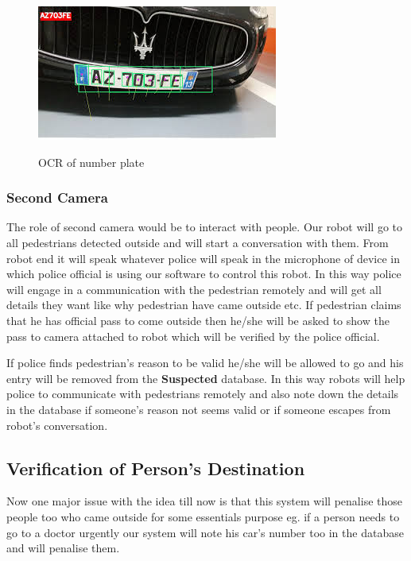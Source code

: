 \documentclass[10pt,twocolumn,letterpaper]{article}
\begin{document}
\begin{figure}[!htb]
	\centering\includegraphics[width=\columnwidth]{ocr}\\
	\caption{OCR of number plate}\label{ocr}
\end{figure}

\subsubsection{Second Camera}
The role of second camera would be to interact with people. Our robot will go to all pedestrians detected outside and will start a conversation with them. From robot end it will speak whatever police will speak in the microphone of device in which police official is using our software to control this robot. In this way police will engage in a communication with the pedestrian remotely and will get all details they want like why pedestrian have came outside etc. If pedestrian claims that he has official pass to come outside then he/she will be asked to show the pass to camera attached to robot which will be verified by the police official. 

If police finds pedestrian's reason to be valid he/she will be allowed to go and his entry will be removed from the \textbf{Suspected} database. In this way robots will help police to communicate with pedestrians remotely and also note down the details in the database if someone's reason not seems valid or if someone escapes from robot's conversation.

\subsection{Verification of Person's Destination}
\label{sec:ver}
Now one major issue with the idea till now is that this system will penalise those people too who came outside for some essentials purpose eg. if a person needs to go to a doctor urgently our system will note his car's number too in the database and will penalise them. 
\end{document}
